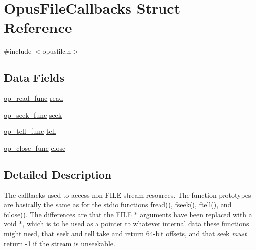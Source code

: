 \hypertarget{struct_opus_file_callbacks}{}\section{Opus\+File\+Callbacks Struct Reference}
\label{struct_opus_file_callbacks}


{\ttfamily \#include $<$opusfile.\+h$>$}

\subsection*{Data Fields}
\begin{DoxyCompactItemize}
\item 
\hyperlink{group__stream__callbacks_ga9ffca429db1f3b77f2f303f1942188c3}{op\+\_\+read\+\_\+func} \hyperlink{struct_opus_file_callbacks_a602ea09a84743a8f4fdc76ab7c0b6ee6}{read}
\item 
\hyperlink{group__stream__callbacks_gae57cb396d1f193d3f4e7e56ddad7760e}{op\+\_\+seek\+\_\+func} \hyperlink{struct_opus_file_callbacks_acf98bb1d13f75d3770206a398be05c8f}{seek}
\item 
\hyperlink{group__stream__callbacks_gaca012812dea4bc3a27b0c23575efecaf}{op\+\_\+tell\+\_\+func} \hyperlink{struct_opus_file_callbacks_a1464ae2f33850101add14a7eb278ff1c}{tell}
\item 
\hyperlink{group__stream__callbacks_ga16c914ec90d301f125cdbeaa1ff57c2d}{op\+\_\+close\+\_\+func} \hyperlink{struct_opus_file_callbacks_a04548cff8eda8ab0322f47cb702fe889}{close}
\end{DoxyCompactItemize}


\subsection{Detailed Description}
The callbacks used to access non-\/{\ttfamily F\+I\+LE} stream resources. The function prototypes are basically the same as for the stdio functions {\ttfamily fread()}, {\ttfamily fseek()}, {\ttfamily ftell()}, and {\ttfamily fclose()}. The differences are that the {\ttfamily F\+I\+LE $\ast$} arguments have been replaced with a {\ttfamily void $\ast$}, which is to be used as a pointer to whatever internal data these functions might need, that \hyperlink{struct_opus_file_callbacks_acf98bb1d13f75d3770206a398be05c8f}{seek} and \hyperlink{struct_opus_file_callbacks_a1464ae2f33850101add14a7eb278ff1c}{tell} take and return 64-\/bit offsets, and that \hyperlink{struct_opus_file_callbacks_acf98bb1d13f75d3770206a398be05c8f}{seek} {\itshape must} return -\/1 if the stream is unseekable. 

